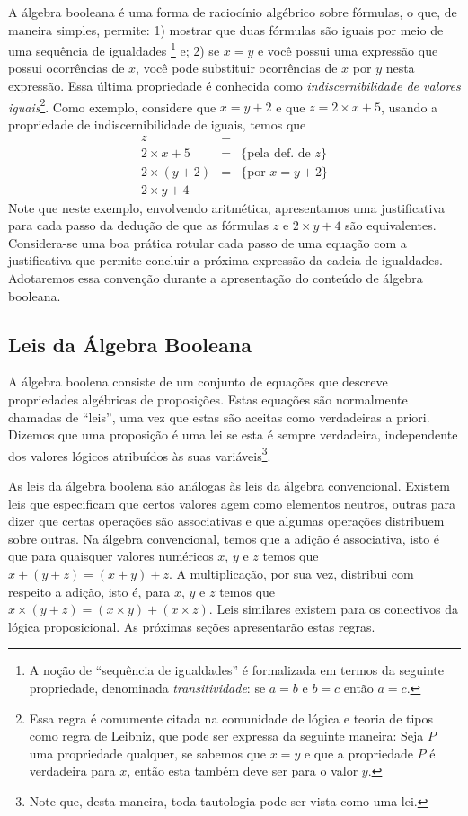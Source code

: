 A álgebra booleana é uma forma de raciocínio algébrico sobre
fórmulas, o que, de maneira simples, permite: 1) mostrar que duas
fórmulas são iguais por meio de uma sequência de igualdades \footnote{A
noção de ``sequência de igualdades'' é formalizada em termos da
seguinte propriedade, denominada \emph{transitividade}: se $a= b$ e $b
= c$ então $a = c$.} e; 2) se $x = y$ e você possui uma expressão que
possui ocorrências de $x$, você pode substituir ocorrências de
$x$ por $y$ nesta expressão. Essa última propriedade é conhecida como
\emph{indiscernibilidade de valores iguais}\footnote{Essa regra é
  comumente citada na comunidade de lógica e teoria de tipos como
  regra de Leibniz, que pode ser expressa da seguinte maneira: Seja
  $P$ uma propriedade qualquer, se sabemos que $x = y$ e que a
  propriedade $P$ é verdadeira para $x$, então esta também deve ser
  para o valor $y$.}. Como exemplo, considere
que $x = y + 2$ e que $z = 2 \times x + 5$, usando a propriedade de
indiscernibilidade de iguais, temos que
\[
\begin{array}{lcl}
z & = & \\
2 \times x + 5 & = & \{\text{pela def. de }z\}\\
2\times (y + 2) & = & \{\text{por }x = y + 2\}\\
2\times y + 4
\end{array}
\]
Note que neste exemplo, envolvendo aritmética, apresentamos uma
justificativa para cada passo da dedução de que as fórmulas $z$ e
$2\times y + 4$ são equivalentes. Considera-se uma boa prática rotular
cada passo de uma equação com a justificativa que permite concluir a
próxima expressão da cadeia de igualdades. Adotaremos essa convenção
durante a apresentação do conteúdo de álgebra booleana.

\subsection{Leis da Álgebra Booleana}

A álgebra boolena consiste de um conjunto de equações que descreve
propriedades algébricas de proposições. Estas equações são normalmente
chamadas de ``leis'', uma vez que estas são aceitas como verdadeiras a
priori. Dizemos que uma proposição é uma lei se esta é sempre
verdadeira, independente dos valores lógicos atribuídos às suas
variáveis\footnote{Note que, desta maneira, toda tautologia pode ser
  vista como uma lei.}.

As leis da álgebra boolena são análogas às leis da álgebra
convencional. Existem leis que especificam que certos valores agem
como elementos neutros, outras para dizer que certas operações são
associativas e que algumas operações distribuem sobre outras. Na
álgebra convencional, temos que a adição é associativa, isto é que
para quaisquer valores numéricos $x$, $y$ e $z$ temos que $x + (y + z)
= (x + y) + z$. A multiplicação, por sua vez, distribui com respeito a
adição, isto é, para $x$, $y$ e $z$ temos que $x \times (y + z) = (x \times
y) + (x \times z)$.  Leis similares existem para os conectivos da
lógica proposicional. As próximas seções apresentarão estas regras.

